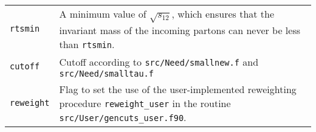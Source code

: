 \begin{longtable}{p{1.5cm}p{12cm}}
		{\tt rtsmin} &
		A minimum value of $\sqrt{s_{12}}$, which ensures that the invariant mass
		of the incoming partons can never be less than {\tt rtsmin}. \\
		
		
		{\tt cutoff} & Cutoff according to \texttt{src/Need/smallnew.f} and
		\texttt{src/Need/smalltau.f} \\

                \texttt{reweight} & Flag to set the use of
		the user-implemented reweighting procedure \texttt{reweight\_user}
		in the routine \texttt{src/User/gencuts\_user.f90}.\\
    		\bottomrule
	\end{longtable}

